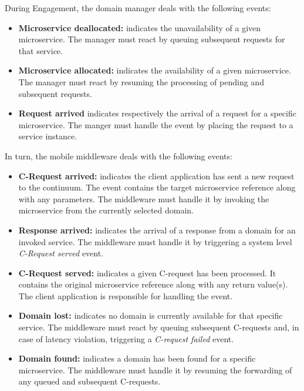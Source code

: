 During Engagement, the domain manager deals with the following events:

\begin{itemize}
	
\item \textbf{Microservice deallocated:} indicates the unavailability of a given microservice. The manager must react by queuing subsequent requests for that service.
	
\item \textbf{Microservice allocated:} indicates the availability of a given microservice. The manager must react by resuming the processing of pending and subsequent requests.

\item \textbf{Request arrived} indicates respectively the arrival of a request for a specific microservice. The manger must handle the event by placing the request to a service instance. %

\end{itemize}

In turn, the mobile middleware deals with the following events:

\begin{itemize}
	\item \textbf{C-Request arrived:} indicates the client application has sent a new request to the continuum. The event contains the target microservice reference along with any parameters. The middleware must handle it by invoking the microservice from the currently selected domain.
	
	\item \textbf{Response arrived:} indicates the arrival of a response from a domain for an invoked service. The middleware must handle it by triggering a system level \textit{C-Request served} event.
	
	\item \textbf{C-Request served:} indicates a given C-request has been processed. It contains the original microservice reference along with any return value(s). The client application is responsible for handling the event.
	
	\item \textbf{Domain lost:} indicates no domain is currently available for that specific service. The middleware must react by queuing subsequent C-requests and, in case of latency violation, triggering a \textit{C-request failed} event.
	
	\item \textbf{Domain found:} indicates a domain has been found for a specific microservice. The middleware must handle it by resuming the forwarding of any queued and subsequent C-requests.
	
\end{itemize}

